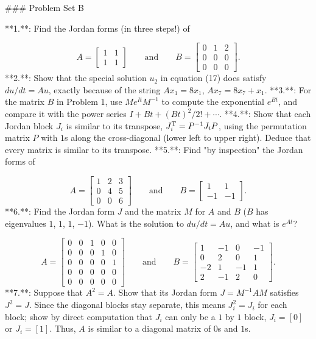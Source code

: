 

### Problem Set B

**1.**: Find the Jordan forms (in three steps!) of

\[A=\begin{bmatrix}1&1\\ 1&1\end{bmatrix}\qquad\text{and}\qquad B=\begin{bmatrix}0&1&2\\ 0&0&0\\ 0&0&0\end{bmatrix}.\]
**2.**: Show that the special solution \(u_{2}\) in equation (17) does satisfy \(du/dt=Au\), exactly because of the string \(Ax_{1}=8x_{1}\), \(Ax_{7}=8x_{7}+x_{1}\).
**3.**: For the matrix \(B\) in Problem 1, use \(Me^{It}M^{-1}\) to compute the exponential \(e^{Bt}\), and compare it with the power series \(I+Bt+(Bt)^{2}/2!+\cdots\).
**4.**: Show that each Jordan block \(J_{i}\) is similar to its transpose, \(J_{i}^{\rm T}=P^{-1}J_{i}P\), using the permutation matrix \(P\) with \(1\)s along the cross-diagonal (lower left to upper right). Deduce that every matrix is similar to its transpose.
**5.**: Find "by inspection" the Jordan forms of

\[A=\begin{bmatrix}1&2&3\\ 0&4&5\\ 0&0&6\end{bmatrix}\qquad\text{and}\qquad B=\begin{bmatrix}1&1\\ -1&-1\end{bmatrix}.\]
**6.**: Find the Jordan form \(J\) and the matrix \(M\) for \(A\) and \(B\) (\(B\) has eigenvalues \(1\), \(1\), \(1\), \(-1\)). What is the solution to \(du/dt=Au\), and what is \(e^{At}\)?

\[A=\begin{bmatrix}0&0&1&0&0\\ 0&0&0&1&0\\ 0&0&0&0&1\\ 0&0&0&0&0\\ 0&0&0&0&0\end{bmatrix}\qquad\text{and}\qquad B=\begin{bmatrix}1&-1&0&-1\\ 0&2&0&1\\ -2&1&-1&1\\ 2&-1&2&0\end{bmatrix}.\]
**7.**: Suppose that \(A^{2}=A\). Show that its Jordan form \(J=M^{-1}AM\) satisfies \(J^{2}=J\). Since the diagonal blocks stay separate, this means \(J_{i}^{2}=J_{i}\) for each block; show by direct computation that \(J_{i}\) can only be a \(1\) by \(1\) block, \(J_{i}=[0]\) or \(J_{i}=[1]\). Thus, \(A\) is similar to a diagonal matrix of \(0\)s and \(1\)s.

